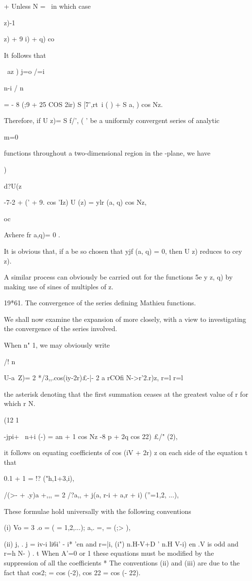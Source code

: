 + Unless N = \, in which case \ \ \ \ {z)-1\ \ {z) + 9 i) + q) co%

%
%

It follows that

\ az ) j=o /=i

n-i / n \

= - 8 (;9 + 25 COS 2ir) S [7',rt\ i ( ) + S a, ) cos Nz.

Therefore, if U z)= S f/', ( ' be a uniformly convergent series of
analytic

m=0

functions throughout a two-dimensional region in the -plane, we have

)

d?U(z

-7-2 + (' + 9. cos 'Iz) U (z) = ylr (a, q) cos Nz,

oc

Avhere fr a,q)= 0 .

It is obvious that, if a be so chosen that yjf (a, q) = 0, then U z)
reduces to cey z).

A similar process can obviously be carried out for the functions 5e y
z, q) by making use of sines of multiples of z.

19*61. The convergence of the series defining Mathieu functions.

We shall now examine the expansion of more closely, with a view
to investigating the convergence of the series involved.

When n" 1, we may obviously write

/! n

U-a\ Z)= 2 */3,,.cos(iy-2r)£-|- 2 a rCOfi N->r'2.r)z, r=l r=l

the asterisk denoting that the first summation ceases at the greatest
value of r for which r N.

 (12 1

-jpi+ \ n+i (-) = an + 1 cos Nz -8 p + 2q cos 22) £/" (2),

it follows on equating coefficients of cos (iV + 2r) z on each side of
the equation t that

0.1 + 1 = !? ("h,1+3,i),

/(>- + .y)a +,,, = 2 /?a,, + j(a, r-i + a,r + i) (''=1,2, ...),

These formulae hold universally with the following conventions %

(i) Vo = 3 .o = ( = 1,2,...); a,. =, = (;> ),

(ii) j, . j = iv-i li6i' - i* 'en and r=|i, (i") n.H-V+D ' n.H V-i)
en .V is odd and r=h N- ) . t When A'=0 or 1 these equations must be
modified by the suppression of all the coefficients * The conventions
(ii) and (iii) are due to the fact that cos2; = cos (-2), cos 22 = cos
(- 22).

}}
